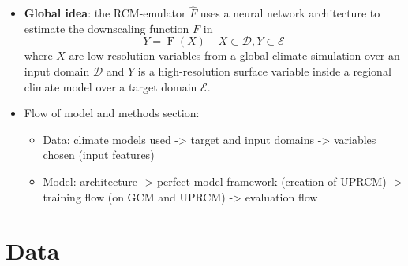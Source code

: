 \documentclass[a4paper,11pt,oneside]{report}
\begin{document}
\begin{itemize}
\item \textbf{Global idea}: the RCM-emulator $\hat{F}$ uses a neural network architecture to estimate the downscaling function $F$ in 
\begin{equation}\label{eq:emulator-equation}
    Y = \operatorname{F}(X) \;\;\;\; X\subset\mathcal{D}, Y\subset\mathcal{E}
    \end{equation}
where $X$ are low-resolution variables from a global climate simulation over an input domain $\mathcal{D}$ and $Y$ is a high-resolution surface variable inside a regional climate model over a target domain $\mathcal{E}$. 
\item Flow of model and methods section: 
\begin{itemize}
    \item Data: climate models used -> target and input domains -> variables chosen (input features)
    \item Model: architecture -> perfect model framework (creation of UPRCM) -> training flow (on GCM and UPRCM) -> evaluation flow
\end{itemize}
\end{itemize}

\section{Data}\label{sec:data}
\end{document}
